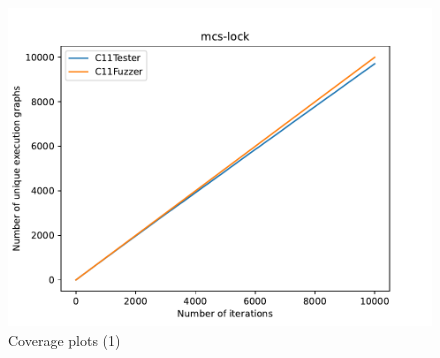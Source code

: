 \begin{figure}[H]
    \begin{minipage}{0.45\textwidth}
        \centering
        \includegraphics[width=\textwidth]{figure/mcs-lock.pdf}
    \end{minipage}
    \hfill
    \begin{minipage}{0.45\textwidth}
        \centering
    \end{minipage}

    \caption{Coverage plots (1)}
    \label{c11tester:cov-plts1}
\end{figure}



